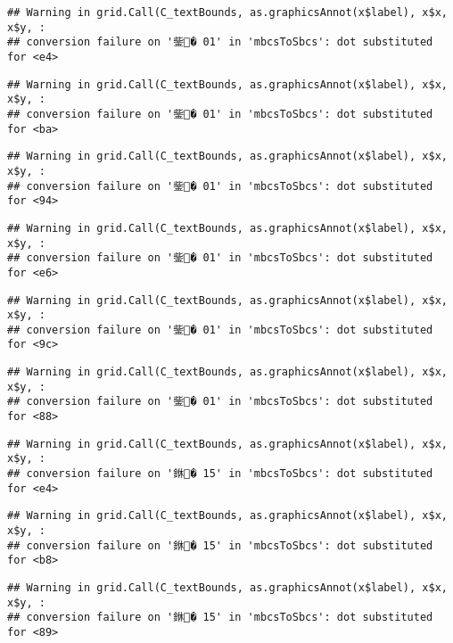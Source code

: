 \documentclass[]{article}
\begin{document}
\begin{verbatim}
## Warning in grid.Call(C_textBounds, as.graphicsAnnot(x$label), x$x, x$y, :
## conversion failure on '鈭� 01' in 'mbcsToSbcs': dot substituted for <e4>
\end{verbatim}

\begin{verbatim}
## Warning in grid.Call(C_textBounds, as.graphicsAnnot(x$label), x$x, x$y, :
## conversion failure on '鈭� 01' in 'mbcsToSbcs': dot substituted for <ba>
\end{verbatim}

\begin{verbatim}
## Warning in grid.Call(C_textBounds, as.graphicsAnnot(x$label), x$x, x$y, :
## conversion failure on '鈭� 01' in 'mbcsToSbcs': dot substituted for <94>
\end{verbatim}

\begin{verbatim}
## Warning in grid.Call(C_textBounds, as.graphicsAnnot(x$label), x$x, x$y, :
## conversion failure on '鈭� 01' in 'mbcsToSbcs': dot substituted for <e6>
\end{verbatim}

\begin{verbatim}
## Warning in grid.Call(C_textBounds, as.graphicsAnnot(x$label), x$x, x$y, :
## conversion failure on '鈭� 01' in 'mbcsToSbcs': dot substituted for <9c>
\end{verbatim}

\begin{verbatim}
## Warning in grid.Call(C_textBounds, as.graphicsAnnot(x$label), x$x, x$y, :
## conversion failure on '鈭� 01' in 'mbcsToSbcs': dot substituted for <88>
\end{verbatim}

\begin{verbatim}
## Warning in grid.Call(C_textBounds, as.graphicsAnnot(x$label), x$x, x$y, :
## conversion failure on '銝� 15' in 'mbcsToSbcs': dot substituted for <e4>
\end{verbatim}

\begin{verbatim}
## Warning in grid.Call(C_textBounds, as.graphicsAnnot(x$label), x$x, x$y, :
## conversion failure on '銝� 15' in 'mbcsToSbcs': dot substituted for <b8>
\end{verbatim}

\begin{verbatim}
## Warning in grid.Call(C_textBounds, as.graphicsAnnot(x$label), x$x, x$y, :
## conversion failure on '銝� 15' in 'mbcsToSbcs': dot substituted for <89>
\end{verbatim}
\end{document}
